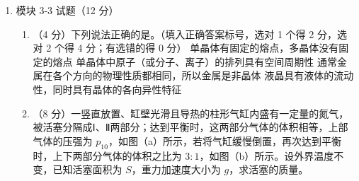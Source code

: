 \documentclass[\gkver]{gaokaozhenti}
\begin{document}
\begin{enumerate}
{（2）粒子进入电场后，先做匀减速运动，直到速度减小为 0，然后沿原路返回做匀加速运动，到达 $x$ 轴时速度大小仍为 $v_{0}$，设粒子在电场中运动的总时间为 $t_{2}$，加速度大小为 $a$，电场强度大小为 $E$，有 $qE=ma$，$v_{0}=\frac{1}{2}at_{2}$，得 $t_{2}=\frac{2mv_{0}}{qE}$。根据题意，要使粒子能够回到 P 点，必须满足 $t_{2}\geq T_{0}$，得电场强度最大值 $E=\frac{2mv_{0}}{qT_{0}}$。
}

\item
模块 3-3 试题（12 分）
\begin{enumerate}
	\item
	（4 分）下列说法正确的是。（填入正确答案标号，选对 1 个得 2 分，选对 2 个得 4 分；有选错的得 0 分）
	{单晶体有固定的熔点，多晶体没有固定的熔点}
	{单晶体中原子（或分子、离子）的排列具有空间周期性}
	{通常金属在各个方向的物理性质都相同，所以金属是非晶体}
	{液晶具有液体的流动性，同时具有晶体的各向异性特征}
	\item
	（8 分）一竖直放置、缸壁光滑且导热的柱形气缸内盛有一定量的氮气，被活塞分隔成Ⅰ、Ⅱ两部分；达到平衡时，这两部分气体的体积相等，上部气体的压强为 $p_{10}$，如图（a）所示，若将气缸缓慢倒置，再次达到平衡时，上下两部分气体的体积之比为 $3:1$，如图（b）所示。设外界温度不变，已知活塞面积为 $S$，重力加速度大小为 $g$，求活塞的质量。
\end{enumerate}


\end{enumerate}
\end{document}
